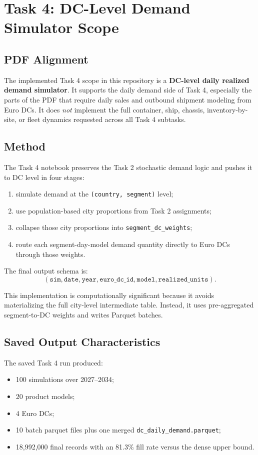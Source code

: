 \documentclass[11pt]{article}
\begin{document}
\section{Task 4: DC-Level Demand Simulator Scope}

\subsection{PDF Alignment}

The implemented Task 4 scope in this repository is a \textbf{DC-level daily realized demand
simulator}. It supports the daily demand side of Task 4, especially the parts of the PDF that
require daily sales and outbound shipment modeling from Euro DCs. It does \emph{not} implement
the full container, ship, chassis, inventory-by-site, or fleet dynamics requested across all
Task 4 subtasks.

\subsection{Method}

The Task 4 notebook preserves the Task 2 stochastic demand logic and pushes it to DC level in
four stages:
\begin{enumerate}
  \item simulate demand at the \texttt{(country, segment)} level;
  \item use population-based city proportions from Task 2 assignments;
  \item collapse those city proportions into \texttt{segment\_dc\_weights};
  \item route each segment-day-model demand quantity directly to Euro DCs through those weights.
\end{enumerate}

The final output schema is:
\[
(\texttt{sim}, \texttt{date}, \texttt{year}, \texttt{euro\_dc\_id}, \texttt{model}, \texttt{realized\_units}).
\]

This implementation is computationally significant because it avoids materializing the full
city-level intermediate table. Instead, it uses pre-aggregated segment-to-DC weights and writes
Parquet batches.

\subsection{Saved Output Characteristics}

The saved Task 4 run produced:
\begin{itemize}
  \item 100 simulations over 2027--2034;
  \item 20 product models;
  \item 4 Euro DCs;
  \item 10 batch parquet files plus one merged \texttt{dc\_daily\_demand.parquet};
  \item 18,992,000 final records with an 81.3\% fill rate versus the dense upper bound.
\end{itemize}
\end{document}
